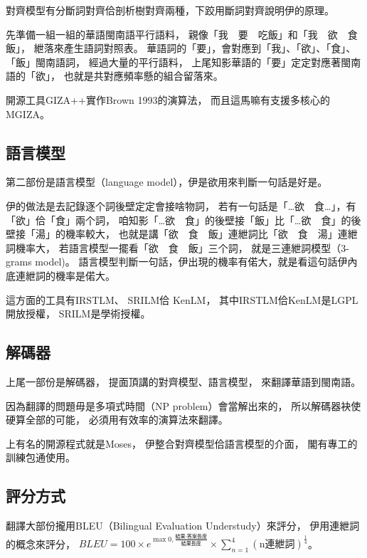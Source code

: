 對齊模型有分斷詞對齊佮剖析樹對齊兩種，下跤用斷詞對齊說明伊的原理。

先準備一組一組的華語閩南語平行語料，
親像「我　要　吃飯」和「我　欲　食　飯」，
紲落來產生語詞對照表。
華語詞的「要」，會對應到「我」、「欲」、「食」、「飯」閩南語詞，
經過大量的平行語料，
上尾知影華語的「要」定定對應著閩南語的「欲」，
也就是共對應頻率懸的組合留落來。

開源工具GIZA++\cite{och2003systematic}實作Brown 1993的演算法，
而且這馬嘛有支援多核心的MGIZA\cite{gao2008parallel}。

\subsection{語言模型}
\label{小節：語言模型}
第二部份是語言模型（language model），伊是欲用來判斷一句話是好是。

伊的做法是去記錄逐个詞後壁定定會接啥物詞，
若有一句話是「…欲　食…」，有「欲」佮「食」兩个詞，
咱知影「…欲　食」的後壁接「飯」比「…欲　食」的後壁接「湯」的機率較大，
也就是講「欲　食　飯」連紲詞比「欲　食　湯」連紲詞機率大，
若語言模型一擺看「欲　食　飯」三个詞，
就是三連紲詞模型（3-grams model)。
語言模型判斷一句話，伊出現的機率有偌大，就是看這句話伊內底連紲詞的機率是偌大。

這方面的工具有IRSTLM\cite{federico2008irstlm}、
SRILM\cite{stolcke2002srilm}佮
KenLM\cite{Heafield-estimate}，
其中IRSTLM佮KenLM是LGPL開放授權，
SRILM是學術授權。

\subsection{解碼器}
\label{小節：解碼器}
上尾一部份是解碼器，
提面頂講的對齊模型、語言模型，
來翻譯華語到閩南語。

因為翻譯的問題毋是多項式時間（NP problem）會當解出來的，
所以解碼器袂使硬算全部的可能，
必須用有效率的演算法來翻譯。

上有名的開源程式就是Moses\cite{Koehn:2007:MOS:1557769.1557821}，
伊整合對齊模型佮語言模型的介面，
閣有專工的訓練包通使用\cite{Moses訓練包}。

\subsection{評分方式}
\label{小節：評分方式}

翻譯大部份攏用BLEU（Bilingual Evaluation Understudy）來評分，
伊用連紲詞的概念來評分，
$BLEU=100\times{e^{\max{0,\frac{\textit{結果-答案長度}}{\textit{結果長度}}}}}\times{\sum_{n=1}^{4}(\textrm{n連紲詞})^{\frac{1}{4}}}$\cite{BLEU程式}。

